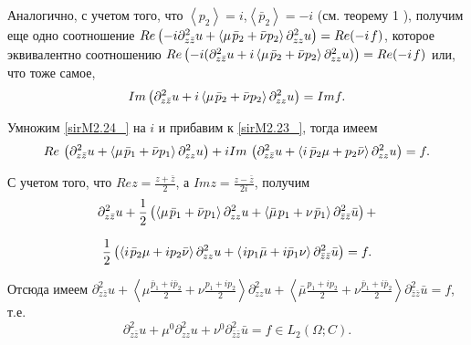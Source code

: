 Аналогично, с учетом того, что $\left\langle p_{2} \right\rangle =i$,$\left\langle \bar{p}_{2} \right\rangle =-i$   (см. теорему 1 ), получим еще одно соотношение  $Re\left(-i\partial _{z\bar{z}}^{2} u+\left\langle \mu {\kern 1pt} \bar{p}_{2} +\bar{\nu }p_{2} \right\rangle \partial _{zz}^{2} u\right)=Re(-i{\kern 1pt} f)$, которое эквивалентно соотношению    $Re\left(-i(\partial _{z\bar{z}}^{2} u+i\left\langle \mu {\kern 1pt} \bar{p}_{2} +\bar{\nu }p_{2} \right\rangle \partial _{zz}^{2} u)\right)=Re(-i{\kern 1pt} f)$    или, что тоже самое,
\begin{equation}
\label{sirM2.24_}
Im\left(\partial _{z\bar{z}}^{2} u+i\left\langle \mu {\kern 1pt} \bar{p}_{2} +\bar{\nu }p_{2} \right\rangle \partial _{zz}^{2} u\right)=Imf.
\end{equation}

Умножим \eqref{sirM2.24_} на $i$ и прибавим к \eqref{sirM2.23_}, тогда имеем
\begin{equation*}
Re\, \left(\partial _{z\bar{z}}^{2} u+\left\langle \mu {\kern 1pt} \bar{p}_{1} +\bar{\nu }p_{1} \right\rangle \partial _{zz}^{2} u\right)+iIm\, \left(\partial _{z\bar{z}}^{2} u+\left\langle i{\kern 1pt} {\kern 1pt} \bar{p}_{2} \mu +p_{2} \bar{\nu }\right\rangle \partial _{zz}^{2} u\right)=f.
\end{equation*}

С учетом того, что $Rez=\frac{z+\bar{z}}{2} $, а $Imz=\frac{z-\bar{z}}{2i} $, получим
\begin{equation*}
\partial _{z\bar{z}}^{2} u+\frac{1}{2} \left(\left\langle \mu {\kern 1pt} \bar{p}_{1} +\bar{\nu }p_{1} \right\rangle \partial _{zz}^{2} u+\left\langle \bar{\mu }{\kern 1pt} p_{1} +\nu {\kern 1pt} \bar{p}_{1} \right\rangle \partial _{\bar{z}\bar{z}}^{2} \bar{u}\right)+
\end{equation*}

\begin{equation*}
\frac{1}{2} \left(\left\langle i{\kern 1pt} \bar{p}_{2} \mu +ip_{2} \bar{\nu }\right\rangle \partial _{zz}^{2} u+\left\langle {\kern 1pt} ip_{1} \bar{\mu }+i\bar{p}_{1} \nu \right\rangle \partial _{\bar{z}\bar{z}}^{2} \bar{u}\right)=f.
\end{equation*}

Отсюда имеем     $\partial _{z\bar{z}}^{2} u+\left\langle \mu \frac{\bar{p}_{1} +i\bar{p}_{2} }{2} +\nu \frac{p_{1} +ip_{2} }{2} \right\rangle \partial _{zz}^{2} u+$$\left\langle \bar{\mu }\frac{p_{1} +ip_{2} }{2} +\nu \frac{\bar{p}_{1} +i\bar{p}_{2} }{2} \right\rangle \partial _{\bar{z}\bar{z}}^{2} \bar{u}=f$, т.е.
\begin{equation*}
\partial _{z\bar{z}}^{2} u+\mu ^{0} \partial _{zz}^{2} u+\nu ^{0} \partial _{\bar{z}\bar{z}}^{2} \bar{u}=f\in L_{2} (\Omega ;C).
\end{equation*}


